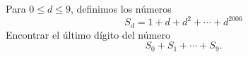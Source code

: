 Para $0 \leq d \leq 9$, definimos los números 
\[S_{d}=1+d+d^{2}+\cdots+d^{2006}\]
Encontrar el último dígito del número
 \[S_{0}+S_{1}+\cdots+S_{9}.\]
